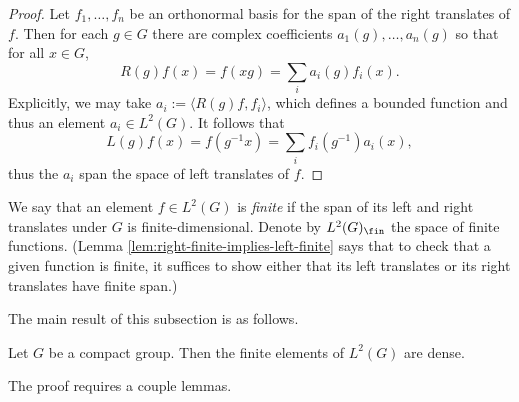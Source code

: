 \documentclass[reqno]{amsart} 
\begin{document}
\begin{proof}
  Let $f_1,\dotsc,f_n$ be an orthonormal basis for the span of the right
  translates of $f$.
  Then for each $g \in G$ there are complex coefficients
  $a_1(g),\dotsc,a_n(g)$
  so that for all $x \in G$,
  \begin{equation*}
  R(g) f(x) = f(x g) = \sum_i a_i(g) f_i(x).
  \end{equation*}
  Explicitly, we may take $a_i := \langle R(g) f, f_i \rangle$,
  which defines a bounded function and thus an element
  $a_i  \in L^2(G)$.
  It follows that
  \begin{equation*}
  L(g) f(x) = f(g^{-1} x)
  = \sum_i f_i(g^{-1}) a_i(x),
  \end{equation*}
  thus the $a_i$ span the space of left translates of $f$.
\end{proof}
\begin{definition}
  We say that an element $f \in L^2(G)$
  is \emph{finite}
  if the span of its left and right translates
  under $G$ is finite-dimensional.
  Denote by $L^2(G)_{\fin}$ the space of finite functions.
  (Lemma \ref{lem:right-finite-implies-left-finite} says that to
  check that a given function is finite, it suffices to show
  either that its left translates or its right translates have
  finite span.)
\end{definition}
The main result of this subsection is as follows.
\begin{theorem}\label{thm:finite-elements-dense}
  Let $G$ be a compact group.  Then the finite elements of $L^2(G)$ are dense.
\end{theorem}
The proof requires a couple lemmas.
\end{document}
